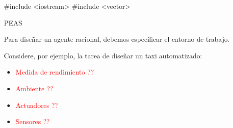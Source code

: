 #include <iostream>
#include <vector>
\begin{frame}{PEAS}

  
    Para diseñar un agente racional, debemos especificar el entorno de trabajo.
    
    Considere, por ejemplo, la tarea de diseñar un taxi automatizado:
    
    \begin{itemize}
        \item \textcolor{red}{Medida de rendimiento ??}
        \item \textcolor{red}{Ambiente ??}
        \item \textcolor{red}{Actuadores ??}
        \item \textcolor{red}{Sensores ??}
    \end{itemize}
    
\end{frame}
